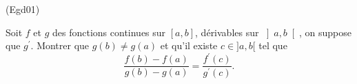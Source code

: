 \begin{tiny}(Egd01)\end{tiny}
Soit $f$ et $g$ des fonctions continues sur $[ a,b] $, d{\'e}rivables sur $\left] a,b\right[ $, on suppose que $g^{\prime}$. Montrer que $g(b) \neq g(a)$ et qu'il existe $c\in ] a,b[ $
tel que
\[
\frac{f(b)-f(a)}{g(b)-g(a)}=\frac{f^{\prime }(c)}{g^{\prime }(c)}.
\]
